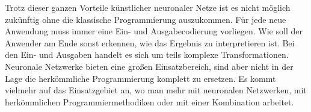 Trotz dieser ganzen Vorteile künstlicher neuronaler Netze ist es nicht möglich zukünftig ohne die klassische Programmierung auszukommen. Für jede neue Anwendung muss immer eine Ein- und Ausgabecodierung vorliegen. Wie soll der Anwender am Ende sonst erkennen, wie das Ergebnis zu interpretieren ist. Bei den Ein- und Ausgaben handelt es sich um teils komplexe Transformationen. Neuronale Netzwerke bieten eine großen Einsatzbereich, sind aber nicht in der Lage die herkömmliche Programmierung komplett zu ersetzen. Es kommt vielmehr auf das Einsatzgebiet an, wo man mehr mit neuronalen Netzwerken, mit herkömmlichen Programmiermethodiken oder mit einer Kombination arbeitet.
